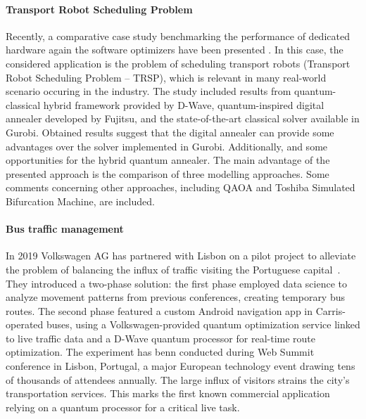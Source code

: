 \documentclass[a4paper,11pt]{article}
\begin{document}
\paragraph{Transport Robot Scheduling Problem} Recently, a comparative case study benchmarking the performance of dedicated hardware again the software optimizers have been presented \cite{leib2023quantum}. In this case, the considered application is the problem of scheduling transport robots (Transport Robot Scheduling Problem -- TRSP), which is relevant in many real-world scenario occuring in the industry. The study included results from quantum-classical hybrid framework provided by D-Wave, quantum-inspired digital annealer developed by Fujitsu, and the state-of-the-art classical solver available in Gurobi. Obtained results suggest that the digital annealer can provide some advantages over the solver implemented in Gurobi.  Additionally,  and some opportunities for the hybrid quantum annealer. The main advantage of the presented approach is the comparison of three modelling approaches. Some comments concerning other approaches, including QAOA and Toshiba Simulated Bifurcation Machine, are included.

%

\paragraph{Bus traffic management}
In 2019 Volkswagen AG has partnered with Lisbon on a pilot project to alleviate the problem of balancing the influx of traffic visiting the Portuguese capital~\cite{yarkoni2020quantum}. They introduced a two-phase solution: the first phase employed data science to analyze movement patterns from previous conferences, creating temporary bus routes. The second phase featured a custom Android navigation app in Carris-operated buses, using a Volkswagen-provided quantum optimization service linked to live traffic data and a D-Wave quantum processor for real-time route optimization. The experiment has benn conducted during Web Summit conference in Lisbon, Portugal, a major European technology event drawing tens of thousands of attendees annually. The large influx of visitors strains the city's transportation services.  This marks the first known commercial application relying on a quantum processor for a critical live task.
\end{document}
